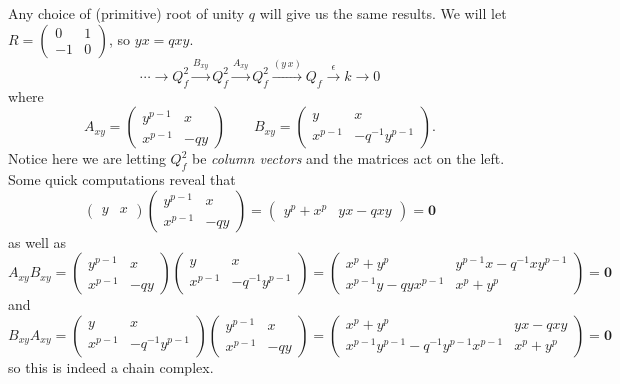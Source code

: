 \documentclass[12pt]{article}
\begin{document}
Any choice of (primitive) root of unity $q$ will give us the same results. We will let $R=(\begin{smallmatrix}0 & 1\\-1 & 0\end{smallmatrix})$, so $yx=qxy.$
\[\cdots\to Q_f^2\xrightarrow{B_{xy}}Q_f^2\xrightarrow{A_{xy}}Q_f^2\xrightarrow{(y\,x)}Q_f\xrightarrow{\epsilon}k\to 0\]
where
\[A_{xy}=\begin{pmatrix}y^{p-1} & x\\x^{p-1} & -qy\end{pmatrix}\qquad B_{xy}=\begin{pmatrix}y & x\\ x^{p-1} & -q^{-1}y^{p-1}\end{pmatrix}.\]
Notice here we are letting $Q_f^2$ be \emph{column vectors} and the matrices act on the left. Some quick computations reveal that
\[\begin{pmatrix}y & x\end{pmatrix}\begin{pmatrix}y^{p-1} & x\\ x^{p-1} & -qy\end{pmatrix}=\begin{pmatrix}y^p+x^p & yx-qxy\end{pmatrix} = \mathbf 0\]
as well as
\[A_{xy}B_{xy}=\begin{pmatrix}y^{p-1} & x\\x^{p-1} & -qy\end{pmatrix}\begin{pmatrix}y & x\\ x^{p-1} & -q^{-1}y^{p-1}\end{pmatrix}=\begin{pmatrix}x^p+y^p & y^{p-1}x-q^{-1}xy^{p-1}\\ x^{p-1}y-qyx^{p-1} &x^p+y^p\end{pmatrix}=\mathbf 0\]
and
\[B_{xy}A_{xy}=\begin{pmatrix}y & x\\ x^{p-1} & -q^{-1}y^{p-1}\end{pmatrix}\begin{pmatrix}y^{p-1} & x\\x^{p-1} & -qy\end{pmatrix}=\begin{pmatrix}x^p+y^p & yx-qxy \\ x^{p-1}y^{p-1}-q^{-1}y^{p-1}x^{p-1} &x^p+y^p\end{pmatrix}=\mathbf 0\]
so this is indeed a chain complex.
\end{document}
